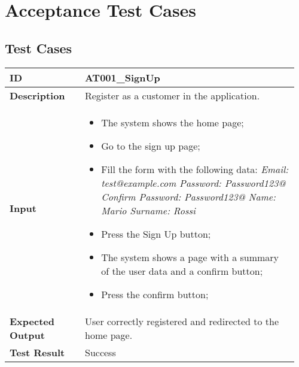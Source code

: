 \chapter{Acceptance Test Cases}

\section{Test Cases}

\begin{table}[H]
	\centering
	\begin{tabular}{@{}p{0.25\linewidth}p{0.71\linewidth}@{}}
		\toprule
		\textbf{ID} & AT001\_SignUp \\
		\midrule
		\textbf{Description} & Register as a customer in the application. \\
		\midrule
		\textbf{Input} & \begin{itemize}[leftmargin=.4cm,noitemsep,topsep=0pt,before=\vspace{-3mm},after=\vspace{-4mm}]
			\item The system shows the home page;
			\item Go to the sign up page;
			\item Fill the form with the following data:\newline
			  \textit{Email: test@example.com\newline
			  Password: Password123@\newline
			  Confirm Password: Password123@\newline
			  Name: Mario\newline
			  Surname: Rossi}
			\item Press the Sign Up button;
			\item The system shows a page with a summary of the user data and a confirm button;
			\item Press the confirm button;
		\end{itemize}\\
		\midrule
		\textbf{Expected Output} & User correctly registered and redirected to the home page.\\
		\midrule
		\textbf{Test Result} & Success\\
		\bottomrule
	\end{tabular}
\end{table}

